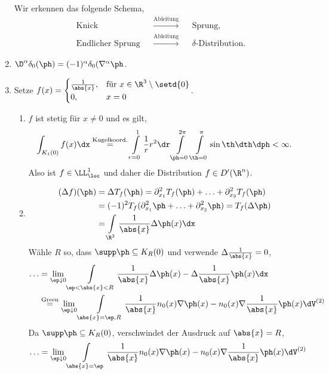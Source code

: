 \begin{bsp}
\begin{enumerate}[label=\arabic{*}.)]
Wir erkennen das folgende Schema,
\begin{align*}
&\text{Knick} &&\overset{\text{Ableitung}}{\longrightarrow} &&\text{Sprung},\\
&\text{Endlicher Sprung} &&\overset{\text{Ableitung}}{\longrightarrow}
&&\delta\text{-Distribution}.
\end{align*}
\item $\D^\alpha \delta_0(\ph) = (-1)^\alpha \delta_0(\nabla^\alpha \ph$.
\item Setze $f(x) = \begin{cases}\frac{1}{\abs{x}},&\text{für
}x\in\R^3\setminus\setd{0}\\ 0, & x = 0\end{cases}$.
\begin{enumerate}[label=\alph{*})]
  \item $f$ ist stetig für $x\neq 0$ und es gilt,
\begin{align*}
\int_{K_1(0)} f(x)\dx \overset{\text{Kugelkoord.}}{=} \int\limits_{r=0}^1
\frac{1}{r} r^2 \dr \int\limits_{\ph=0}^{2\pi}\int\limits_{\th=0}^\pi \sin\th
\dth\dph < \infty.
\end{align*}
Also ist $f\in\LL_\loc^1$ und daher die Distribution $f\in D'(\R^n)$.
\item 
\begin{align*}
(\Delta f)(\ph) &= \Delta T_f (\ph) = \partial_{x_1}^2 T_f(\ph) + \ldots +
\partial_{x_3}^2 T_f(\ph)\\
&= (-1)^2 T_f(\partial_{x_1}^2 \ph+ \ldots +\partial_{x_3}^2 \ph) = T_f(\Delta
\ph)\\
&= \int\limits_{\R^3} \frac{1}{\abs{x}}\Delta \ph(x)\dx
\end{align*}
Wähle $R$ so, dass $\supp\ph \subseteq K_{R}(0)$ und verwende $\Delta
\frac{1}{\abs{x}}  = 0$,
\begin{align*}
\ldots &= \lim\limits_{\ep\downarrow 0} \int\limits_{\ep < \abs{x} < R}
\frac{1}{\abs{x}}\Delta \ph(x) - \Delta\frac{1}{\abs{x}}\ph(x)\dx\\
&\overset{\text{Green}}{=}
\lim\limits_{\ep\downarrow 0} \int\limits_{\abs{x}=\ep,R}
\frac{1}{\abs{x}}n_0(x) \nabla\ph(x) -
n_0(x)\nabla\frac{1}{\abs{x}}\ph(x)\dV^{(2)}
\end{align*}
Da $\supp\ph \subseteq K_{R}(0)$, verschwindet der Ausdruck auf $\abs{x}=R$,
\begin{align*}
\ldots = \lim\limits_{\ep\downarrow 0} \int\limits_{\abs{x}=\ep}
\frac{1}{\abs{x}}n_0(x) \nabla\ph(x) -
n_0(x)\nabla\frac{1}{\abs{x}}\ph(x)\dV^{(2)}
\end{align*}

\end{enumerate}
\end{enumerate}
\end{bsp}
